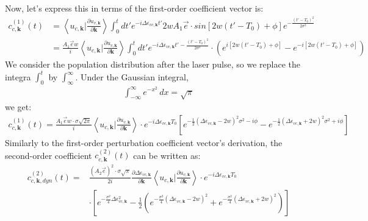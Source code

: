 Now, let's express this in terms of the first-order coefficient vector is:
\begin{equation}
\begin{aligned}
     c^{(1)}_{c,\mathbf k}(t) &= \left \langle u_{c,\mathbf k}\Big |\frac{\partial u_{v,\mathbf k}}{\partial \mathbf k} \right \rangle \int_0^t dt' e^{-i \Delta \epsilon_{vc,\mathbf k}t'} 
      2wA_1 \vec e \cdot sin[2w(t'-T_0)+\phi]  e^{-\frac{(t'-T_0)^2}{2\sigma^2}}\\
      &=\frac{A_1 \vec e w}{i} \left \langle u_{c,\mathbf k}\Big |\frac{\partial u_{v,\mathbf k}}{\partial \mathbf k} \right \rangle \int_0^t dt' e^{-i \Delta \epsilon_{vc,\mathbf k}t' - \frac{(t'-T_0)^2}{2\sigma^2}} 
      \cdot (e^{i[2w(t'-T_0)+\phi]}-e^{-i[2w(t'-T_0)+\phi]}) 
\end{aligned}
\end{equation}
We consider the population distribution after the laser pulse, so we replace the integra $\int_0^t$ by $\int_\infty^\infty$. Under the Gaussian integral, 
\begin{align}
\int_{-\infty}^{\infty} e^{-x^2} \, dx = \sqrt{\pi}
\end{align}
we get:
\begin{equation}
\begin{aligned}
     c^{(1)}_{c,\mathbf k}(t) = \frac{A_1 \vec e w \cdot \sigma \sqrt{2\pi}}{i} \left \langle u_{c,\mathbf k}\Big |\frac{\partial u_{v,\mathbf k}}{\partial \mathbf k} \right \rangle \cdot  e^{-i\Delta \epsilon_{vc,\mathbf k} T_0}
    [e^{-\frac{1}{2}(\Delta \epsilon_{vc,\mathbf k} - 2w)^2 \sigma^2-i\phi}
    -e^{-\frac{1}{2}(\Delta \epsilon_{vc,\mathbf k} + 2w)^2 \sigma^2+i\phi}]
\end{aligned}
\end{equation}
Similarly to the first-order perturbation coefficient vector's derivation, the second-order coefficient $c^{(2)}_{c,\mathbf k}(t)$ can be written as:
\begin{equation}
\begin{aligned}
    c^{(2)}_{c,\mathbf k,dyn}(t)=&\frac{(A_2 \vec e)^2 \cdot \sigma \sqrt{\pi}}{2i} \frac{\partial
    \Delta \epsilon_{vc,\mathbf k}}{\partial \mathbf k} \left \langle u_{c,\mathbf k}\Big |\frac{\partial
u_{v,\mathbf k}}{\partial \mathbf k} \right \rangle \cdot e^{-i\Delta \epsilon_{vc,\mathbf k} T_0}\\
    &\cdot [e^{-\frac{\sigma^2}{4} \Delta \epsilon_{vc,\mathbf k} ^2}-\frac{1}{2}(e^{-\frac{\sigma^2}{4} (\Delta \epsilon_{vc,\mathbf k}-2w)^2}+e^{-\frac{\sigma^2}{4} (\Delta \epsilon_{vc,\mathbf k}+2w)^2})]
\end{aligned}
\end{equation}

